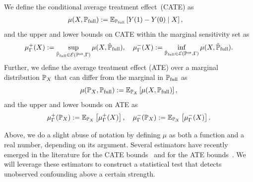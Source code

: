 \begin{definition} 
\label{def:cate_sensitivity}
We define the conditional average treatment effect~(CATE) as 
\begin{align*}
\mu (X, \mathbb{P}_{\operatorname{full}}) &:= \mathbb{E}_{\mathbb{P}_{\operatorname{full}}}\left[ Y(1) - Y(0) \mid X \right], 
\end{align*}
and the upper and lower bounds on CATE within the marginal sensitivity set as 
\begin{align*}
\mu^+_\Gamma(X) := \sup _{\tilde{\mathbb{P}}_{\operatorname{full}} \in \mathcal{E}(\mathbb{P}^{\operatorname{os}}, \Gamma)} \mu(X,\tilde{\mathbb{P}}_{\operatorname{full}}),\quad 
\mu^{-}_\Gamma(X) := \inf_{\tilde{\mathbb{P}}_{\operatorname{full}} \in \mathcal{E}(\mathbb{P}^{\operatorname{os}}, \Gamma)} \mu(X,\tilde{\mathbb{P}}_{\operatorname{full}}).
\end{align*}
Further, we define the average treatment effect (ATE) over a marginal distribution $\mathbb{P}_X$ that can differ from the marginal in $\mathbb{P}_{\operatorname{full}}$ as
	$$\mu(\mathbb{P}_X,\mathbb{P}_{\operatorname{full}}) := \mathbb{E}_{\mathbb{P}_X}\left[\mu(X,\mathbb{P}_{\operatorname{full}})\right],$$
and the upper and lower bounds on ATE as
\begin{align*}
\mu^+_\Gamma(\mathbb{P}_X) := \mathbb{E}_{\mathbb{P}_X}\left[\mu^+_\Gamma(X)\right],  \quad 	\mu^-_\Gamma(\mathbb{P}_X) := \mathbb{E}_{\mathbb{P}_X}\left[\mu^-_\Gamma(X)\right].
\end{align*}
\end{definition}

Above, we do a slight abuse of notation by defining $\mu$ as both a function and a real number, depending on its argument.
Several estimators have recently emerged in the literature for the CATE bounds~\citep{kallus2019interval,jesson2021quantifying,oprescu2023b}  and for the ATE bounds~\citep{zhao2019sensitivity,dorn2021doubly,dorn2022sharp}. We will leverage these estimators to construct a statistical test that detects unobserved confounding above a certain strength.
